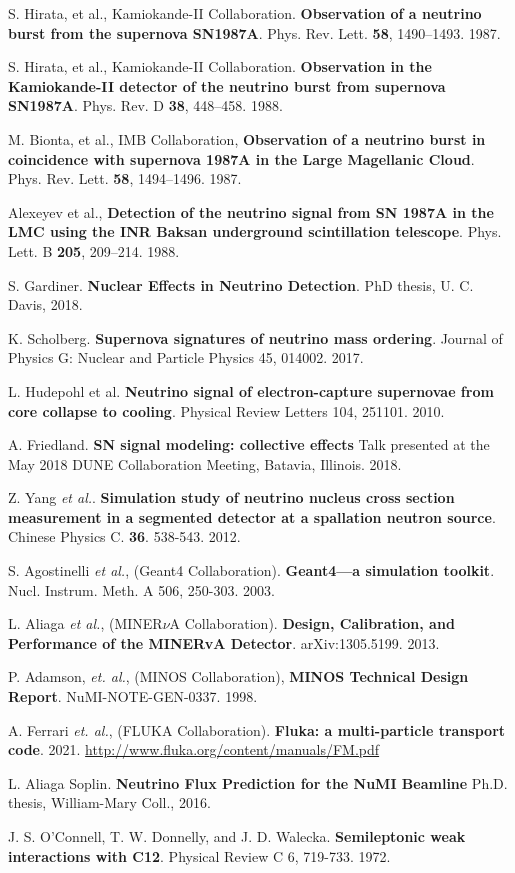  S. Hirata, et al., Kamiokande-II Collaboration. \textbf{Observation of a neutrino burst from the supernova SN1987A}. Phys. Rev. Lett. \textbf{58}, 1490–1493. 1987.

 S. Hirata, et al., Kamiokande-II Collaboration. \textbf{Observation in the Kamiokande-II detector of the neutrino burst from supernova SN1987A}. Phys. Rev. D \textbf{38}, 448–458. 1988.

 M. Bionta, et al., IMB Collaboration, \textbf{Observation of a neutrino burst in coincidence with supernova 1987A in the Large Magellanic Cloud}. Phys. Rev. Lett. \textbf{58}, 1494–1496. 1987. 

 Alexeyev et al., \textbf{Detection of the neutrino signal from SN 1987A in the LMC using the INR Baksan underground scintillation telescope}. Phys. Lett. B \textbf{205}, 209–214. 1988.

 S. Gardiner. \textbf{Nuclear Effects in Neutrino Detection}. PhD thesis,  U. C. Davis, 2018.

 K. Scholberg. \textbf{Supernova signatures of neutrino mass ordering}. Journal of Physics G: Nuclear and Particle Physics 45, 014002. 2017.

 L. Hudepohl et al. \textbf{Neutrino signal of electron-capture supernovae from core collapse to cooling}. Physical Review Letters 104, 251101. 2010.

 A. Friedland. \textbf{SN signal modeling: collective effects} Talk presented at the May 2018 DUNE Collaboration Meeting, Batavia, Illinois. 2018. 

 Z. Yang \textit{et al.}. \textbf{Simulation study of neutrino nucleus cross section measurement in a segmented detector at a spallation neutron source}. Chinese Physics C. \textbf{36}. 538-543. 2012. 


 S. Agostinelli \textit{et al.}, (Geant4 Collaboration). \textbf{Geant4—a simulation toolkit}. Nucl. Instrum. Meth. A 506, 250-303. 2003.

 L. Aliaga \textit{et al.}, (MINER$\nu$A Collaboration). \textbf{Design, Calibration, and Performance of the MINERvA Detector}.  arXiv:1305.5199. 2013. 

 P. Adamson, \textit{et. al.}, (MINOS Collaboration), \textbf{MINOS Technical Design Report}. NuMI-NOTE-GEN-0337. 1998.

 A. Ferrari \textit{et. al.}, (FLUKA Collaboration). \textbf{Fluka:
a multi-particle transport code}. 2021. \href{http://www.fluka.org/content/manuals/FM.pdf
}{http://www.fluka.org/content/manuals/FM.pdf}

 L. Aliaga Soplin. \textbf{Neutrino Flux Prediction for the NuMI Beamline} Ph.D. thesis, William-Mary Coll., 2016.

 J. S. O’Connell, T. W. Donnelly, and J. D. Walecka. \textbf{Semileptonic weak interactions with C12}. Physical Review C 6, 719-733. 1972.